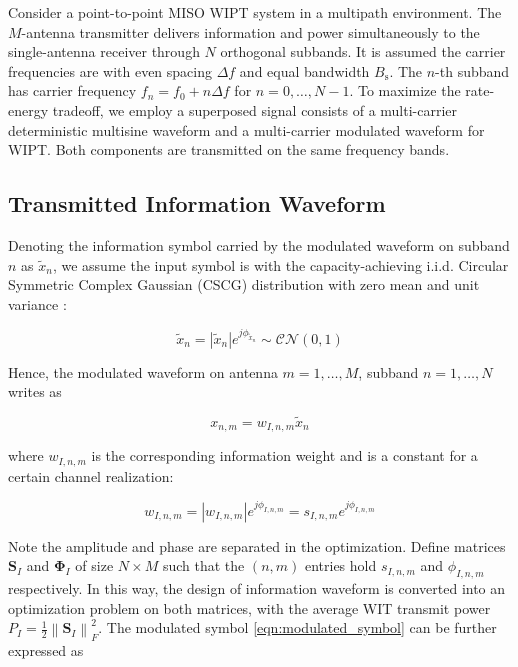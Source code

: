 Consider a point-to-point MISO WIPT system in a multipath environment. The $M$-antenna transmitter delivers information and power simultaneously to the single-antenna receiver through $N$ orthogonal subbands. It is assumed the carrier frequencies are with even spacing $\Delta f$ and equal bandwidth ${B_{\text{s}}}$. The $n$-th subband has carrier frequency ${f_n} = {f_0} + n\Delta f$ for $n = 0, \ldots ,N - 1$. To maximize the rate-energy tradeoff, we employ a superposed signal consists of a multi-carrier deterministic multisine waveform and a multi-carrier modulated waveform for WIPT. Both components are transmitted on the same frequency bands.



\subsection{Transmitted Information Waveform}\label{sec:transmitted-information-waveform}
Denoting the information symbol carried by the modulated waveform on subband $n$ as ${{\tilde x}_n}$, we assume the input symbol is with the capacity-achieving i.i.d. Circular Symmetric Complex Gaussian (CSCG) distribution with zero mean and unit variance \cite{Varasteh2017a}:

\begin{equation}\label{eqn:unmodulated_symbol}
  {{\tilde x}_n} = \left| {{{\tilde x}_n}} \right|{e^{j{\phi _{{{\tilde x}_n}}}}}\sim\mathcal{C}\mathcal{N}(0,1)
\end{equation}

Hence, the modulated waveform on antenna $m = 1, \ldots ,M$, subband $n = 1, \ldots ,N$ writes as

\begin{equation}\label{eqn:modulated_symbol}
  {x_{n,m}} = {w_{I,n,m}}{{\tilde x}_n}
\end{equation}

where ${w_{I,n,m}}$ is the corresponding information weight and is a constant for a certain channel realization:

\begin{equation}\label{eqn:weight_information}
  {w_{I,n,m}} = \left| {{w_{I,n,m}}} \right|{e^{j{\phi _{I,n,m}}}} = {s_{I,n,m}}{e^{j{\phi _{I,n,m}}}}
\end{equation}

Note the amplitude and phase are separated in the optimization. Define matrices ${{\mathbf{S}}_I}$ and ${{\mathbf{\Phi }}_I}$ of size $N \times M$ such that the $(n,m)$ entries hold ${s_{I,n,m}}$ and ${\phi _{I,n,m}}$ respectively. In this way, the design of information waveform is converted into an optimization problem on both matrices, with the average WIT transmit power ${P_I} = \frac{1}{2}\left\| {{{\mathbf{S}}_I}} \right\|_F^2$. The modulated symbol \eqref{eqn:modulated_symbol} can be further expressed as

